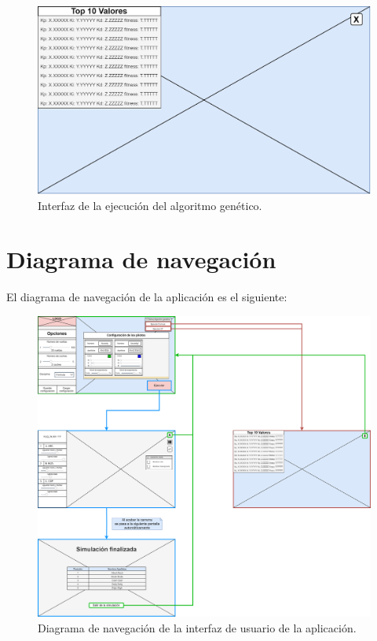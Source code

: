 \begin{figure}[H]
    \centering
    \includegraphics[width=\textwidth]{imagenes/ga.png}
    \caption{Interfaz de la ejecución del algoritmo genético.}
\end{figure}

\newpage

\section{Diagrama de navegación}



El diagrama de navegación de la aplicación es el siguiente:

\begin{figure}[H]
    \centering
    \includegraphics[width=\textwidth]{imagenes/nav.png}
    \caption{Diagrama de navegación de la interfaz de usuario de la aplicación.}
\end{figure}

